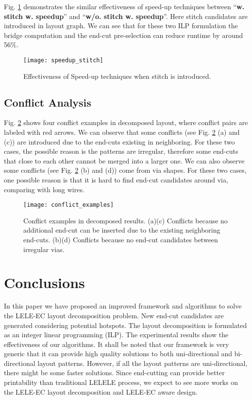 \documentclass[12pt]{spieman}
\theoremstyle{plain}
\begin{document}
\begin{spacing}{1}
Fig. \ref{fig:tplec_speedup_stitch} demonstrates the similar effectiveness of speed-up techniques between ``\textbf{w. stitch w. speedup}'' and ``\textbf{w/o. stitch w. speedup}''.
Here stitch candidates are introduced in layout graph.
We can see that for these two ILP formulation the bridge computation and the end-cut pre-selection can reduce runtime by around 56\%.

\begin{figure}[htb]
  \centering
  \texttt{[image: speedup\_stitch]}
  \caption{Effectiveness of Speed-up techniques when stitch is introduced.}
  \label{fig:tplec_speedup_stitch}
\end{figure}


\subsection{Conflict Analysis}

Fig. \ref{fig:tplec_conflicts} shows four conflict examples in decomposed layout, where conflict pairs are labeled with red arrows.
We can observe that some conflicts (see Fig. \ref{fig:tplec_conflicts} (a) and (c)) are introduced due to the end-cuts existing in neighboring.
For these two cases, the possible reason is the patterns are irregular, therefore some end-cuts that close to each other cannot be merged into a larger one.
We can also observe some conflicts (see Fig. \ref{fig:tplec_conflicts} (b) and (d)) come from via shapes.
For these two cases, one possible reason is that it is hard to find end-cut candidates around via, comparing with long wires.

\begin{figure}[htb]
  \centering
  \texttt{[image: conflict\_examples]}
  \caption{Conflict examples in decomposed results.
  (a)(c) Conflicts because no additional end-cut can be inserted due to the existing neighboring end-cuts.
  (b)(d) Conflicts because no end-cut candidates between irregular vias.
  }
  \label{fig:tplec_conflicts}
\end{figure}



\section{Conclusions}
\label{sec:tplec_conclu}

In this paper we have proposed an improved framework and algorithms to solve the LELE-EC layout decomposition problem.
New end-cut candidates are generated considering potential hotspots.
The layout decomposition is formulated as an integer linear programming (ILP).
The experimental results show the effectiveness of our algorithms.
It shall be noted that our framework is very generic that it can provide high quality solutions to both uni-directional and bi-directional layout patterns.
However, if all the layout patterns are uni-directional, there might be some faster solutions.
Since end-cutting can provide better printability than traditional LELELE process,
we expect to see more works on the LELE-EC layout decomposition and LELE-EC aware design.


\end{spacing}
\end{document}
